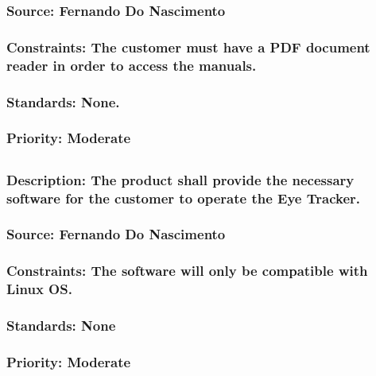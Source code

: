 \subsubsection{Source: Fernando Do Nascimento}
\subsubsection{Constraints: The customer must have a PDF document reader in order to access the manuals.}
\subsubsection{Standards: None.}
\subsubsection{Priority: Moderate}

\subsection{\bfSoftware}
\subsubsection{Description: The product shall provide the necessary software for the customer to operate the Eye Tracker.}
\subsubsection{Source: Fernando Do Nascimento}
\subsubsection{Constraints: The software will only be compatible with Linux OS.}
\subsubsection{Standards: None}
\subsubsection{Priority: Moderate}
